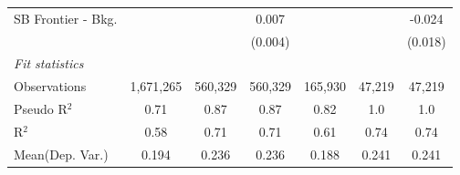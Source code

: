 \begin{tabular}{lcccccc}
   SB Frontier - Bkg.             &                &                & 0.007          &                &                & -0.024\\   
                                  &                &                & (0.004)        &                &                & (0.018)\\   
   \midrule
   \emph{Fit statistics}\\
   Observations                   & 1,671,265      & 560,329        & 560,329        & 165,930        & 47,219         & 47,219\\  
   Pseudo R$^2$                   & 0.71           & 0.87           & 0.87           & 0.82           & 1.0            & 1.0\\  
   R$^2$                          & 0.58           & 0.71           & 0.71           & 0.61           & 0.74           & 0.74\\  
Mean(Dep. Var.) & 0.194 & 0.236 & 0.236 & 0.188 & 0.241 & 0.241 \\
   

\end{tabular}
